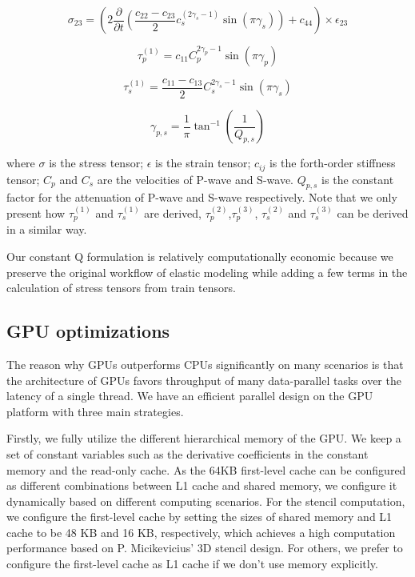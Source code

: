\documentclass{paris17}
\begin{document}
\begin{equation}
  \sigma_{23} = \left ( 2\frac{\partial}{\partial t} \left( \frac{c_{22}-c_{23}}{2}c_s^{(2\gamma_s-1)}\sin(\pi\gamma_s) \right) + c_{44} \right )\times \epsilon_{23}
\end{equation}

\begin{equation}
  \tau_p^{(1)} = c_{11}C_p^{2\gamma_p - 1}\sin(\pi \gamma_p)
\end{equation}

\begin{equation}
  \tau_s^{(1)} = \frac{c_{11} - c_{13}}{2}C_s^{2\gamma_s - 1}\sin(\pi \gamma_s)
\end{equation}

\begin{equation}
  \gamma_{p,s}=\frac{1}{\pi}\tan^{-1}(\frac{1}{Q_{p,s}})
\end{equation}

where $\sigma$ is the stress tensor; $\epsilon$ is the strain tensor; $c_{ij}$ is the forth-order stiffness tensor; $C_p$ and $C_s$ are the velocities of P-wave and S-wave. $Q_{p,s}$ is the constant factor for the attenuation of P-wave and S-wave respectively. Note that we only present how $\tau_p^{(1)}$ and $\tau_s^{(1)}$ are derived, $\tau_p^{(2)}$,$\tau_p^{(3)}$, $\tau_s^{(2)}$ and $\tau_s^{(3)}$ can be derived in a similar way.

Our constant Q formulation is relatively computationally economic because we preserve the original workflow of elastic modeling while adding a few terms in the calculation of stress tensors from train tensors.

\subsection{GPU optimizations}

The reason why GPUs outperforms CPUs significantly on many scenarios is that the architecture of GPUs favors throughput of many data-parallel tasks over the latency of a single thread. We have an efficient parallel design on the GPU platform with three main strategies.

Firstly, we fully utilize the different hierarchical memory of the GPU. We keep a set of constant variables such as the derivative coefficients in the constant memory and the read-only cache. As the 64KB first-level cache can be configured as different combinations between L1 cache and shared memory, we configure it dynamically based on different computing scenarios. For the stencil computation, we configure the first-level cache by setting the sizes of shared memory and L1 cache to be 48 KB and 16 KB, respectively, which achieves a high computation performance based on P. Micikevicius’ 3D stencil design. For others, we prefer to configure the first-level cache as L1 cache if we don't use memory explicitly.
\end{document}
